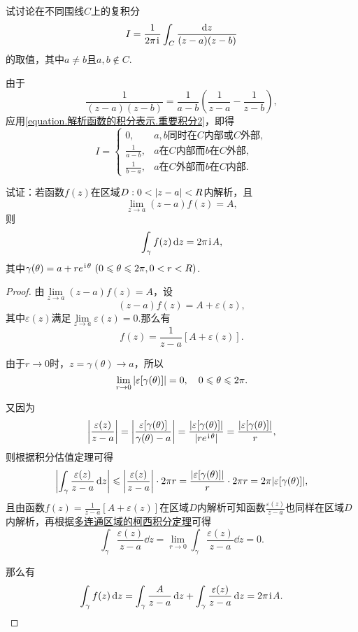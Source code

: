 \begin{example}
试讨论在不同围线\(C\)上的复积分\[
I = \frac{1}{2\pi\kern1pt\mathrm{i}\kern1pt} \int_C \frac{\dd{z}}{(z-a)(z-b)}
\]的取值，其中\(a \neq b\)且\(a,b \notin C\).
\begin{solution}
由于\[
\frac{1}{(z-a)(z-b)}
= \frac{1}{a-b} \left(\frac{1}{z-a}-\frac{1}{z-b}\right),
\]应用\cref{equation.解析函数的积分表示.重要积分2}，即得\[
I = \left\{\begin{array}{cl}
0, & \text{\(a,b\)同时在\(C\)内部或\(C\)外部}, \\
\frac{1}{a-b}, & \text{\(a\)在\(C\)内部而\(b\)在\(C\)外部}, \\
\frac{1}{b-a}, & \text{\(a\)在\(C\)外部而\(b\)在\(C\)内部}.
\end{array}\right.
\]
\end{solution}
\end{example}

\begin{example}%
试证：若函数\(f(z)\)在区域\(D: 0<\abs{z-a}<R\)内解析，且\[
\lim\limits_{z \to a}(z-a)f(z)=A,
\]则\[
\int_{\gamma} f(z) \dd{z} = 2\pi\kern1pt\mathrm{i}\kern1pt A,
\]其中\(\gamma(\theta) = a+re^{\kern1pt\mathrm{i}\kern1pt\theta}\ (0 \leqslant \theta \leqslant 2\pi, 0 < r < R)\).
\begin{proof}
由\(\lim\limits_{z \to a}(z-a)f(z) = A\)，设\[
(z-a)f(z) = A + \varepsilon(z),
\]其中\(\varepsilon(z)\)满足\(\lim\limits_{z \to a} \varepsilon(z) = 0\).那么有\[
f(z) = \frac{1}{z-a}[A+\varepsilon(z)].
\]

由于\(r\to0\)时，\(z=\gamma(\theta) \to a\)，所以\[
\lim\limits_{r\to0} \abs{\varepsilon[\gamma(\theta)]} = 0,
\quad 0 \leqslant \theta \leqslant 2\pi.
\]

又因为\[
\abs{\frac{\varepsilon(z)}{z-a}}
= \abs{\frac{\varepsilon[\gamma(\theta)]}{\gamma(\theta)-a}}
= \frac{\abs{\varepsilon[\gamma(\theta)]}}{\abs{re^{\kern1pt\mathrm{i}\kern1pt\theta}}}
= \frac{\abs{\varepsilon[\gamma(\theta)]}}{r},
\]则根据积分估值定理可得\[
\abs{\int_{\gamma} \frac{\varepsilon(z)}{z-a} \dd{z}}
\leqslant \abs{\frac{\varepsilon(z)}{z-a}} \cdot 2\pi r
= \frac{\abs{\varepsilon[\gamma(\theta)]}}{r} \cdot 2\pi r
= 2\pi \abs{\varepsilon[\gamma(\theta)]},
\]且由函数\(f(z) = \frac{1}{z-a}[A+\varepsilon(z)]\)在区域\(D\)内解析可知函数\(\frac{\varepsilon(z)}{z-a}\)也同样在区域\(D\)内解析，再根据\hyperref[theorem:解析函数的积分表示.多连通区域的柯西积分定理]{多连通区域的柯西积分定理}可得\[
\int_{\gamma} \frac{\varepsilon(z)}{z-a} \dd{z}
= \lim\limits_{r\to0} \int_{\gamma} \frac{\varepsilon(z)}{z-a} \dd{z}
= 0.
\]

那么有
\[
\int_{\gamma} f(z) \dd{z}
= \int_{\gamma} \frac{A}{z-a} \dd{z}
+ \int_{\gamma} \frac{\varepsilon(z)}{z-a} \dd{z}
= 2\pi\kern1pt\mathrm{i}\kern1pt A.
\qedhere
\]
\end{proof}
\end{example}

